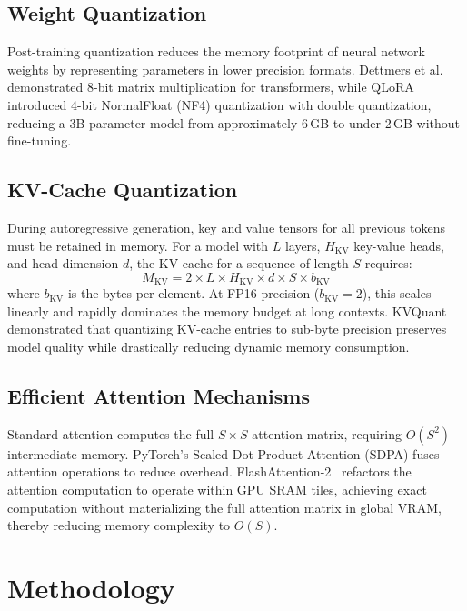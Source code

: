 \documentclass[conference]{IEEEtran}
\begin{document}
\subsection{Weight Quantization}
Post-training quantization reduces the memory footprint of neural network weights by representing parameters in lower precision formats. Dettmers et al.~\cite{dettmers2022llm} demonstrated 8-bit matrix multiplication for transformers, while QLoRA~\cite{dettmers2024qlora} introduced 4-bit NormalFloat (NF4) quantization with double quantization, reducing a 3B-parameter model from approximately 6\,GB to under 2\,GB without fine-tuning.

\subsection{KV-Cache Quantization}
During autoregressive generation, key and value tensors for all previous tokens must be retained in memory. For a model with $L$ layers, $H_{\text{KV}}$ key-value heads, and head dimension $d$, the KV-cache for a sequence of length $S$ requires:
\begin{equation}
M_{\text{KV}} = 2 \times L \times H_{\text{KV}} \times d \times S \times b_{\text{KV}}
\label{eq:kv_mem}
\end{equation}
where $b_{\text{KV}}$ is the bytes per element. At FP16 precision ($b_{\text{KV}}=2$), this scales linearly and rapidly dominates the memory budget at long contexts. KVQuant~\cite{hooper2024kvquant} demonstrated that quantizing KV-cache entries to sub-byte precision preserves model quality while drastically reducing dynamic memory consumption.

\subsection{Efficient Attention Mechanisms}
Standard attention computes the full $S \times S$ attention matrix, requiring $O(S^2)$ intermediate memory. PyTorch's Scaled Dot-Product Attention (SDPA) fuses attention operations to reduce overhead. FlashAttention-2~\cite{dao2023flashattention2} refactors the attention computation to operate within GPU SRAM tiles, achieving exact computation without materializing the full attention matrix in global VRAM, thereby reducing memory complexity to $O(S)$.

\section{Methodology}
\label{sec:methodology}
\end{document}
